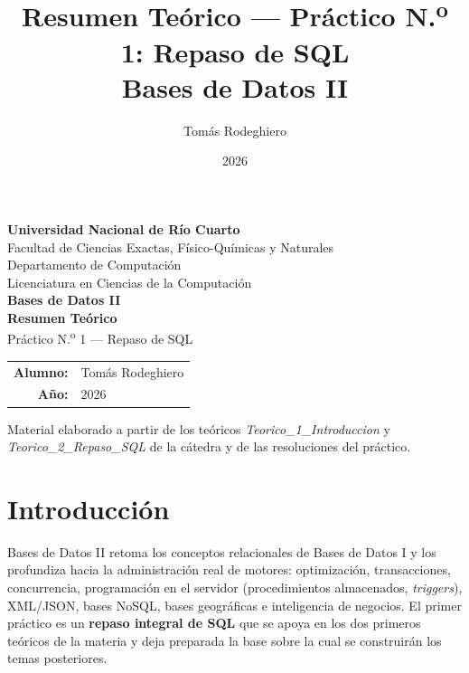 \documentclass[11pt,a4paper]{article}
\title{Resumen Teórico --- Práctico N.\textsuperscript{o} 1: Repaso de SQL\\[4pt]
       \large Bases de Datos II}
\author{Tomás Rodeghiero}
\date{2026}
\begin{document}
\begin{titlepage}
    \centering
    \vspace*{1.5cm}

    {\large \textbf{Universidad Nacional de Río Cuarto}}\\[6pt]
    {\normalsize Facultad de Ciencias Exactas, Físico-Químicas y Naturales}\\[4pt]
    {\normalsize Departamento de Computación}\\[4pt]
    {\normalsize Licenciatura en Ciencias de la Computación}\\[3cm]

    {\Large \textbf{Bases de Datos II}}\\[1.2cm]

    {\Large \textbf{Resumen Teórico}}\\[6pt]
    {\large Práctico N.\textsuperscript{o} 1 --- Repaso de SQL}\\[3cm]

    \begin{tabular}{rl}
        \textbf{Alumno:} & Tomás Rodeghiero \\[4pt]
        \textbf{Año:}    & 2026 \\
    \end{tabular}

    \vfill
    {\small Material elaborado a partir de los teóricos
    \emph{Teorico\_1\_Introduccion} y \emph{Teorico\_2\_Repaso\_SQL}
    de la cátedra y de las resoluciones del práctico.}
\end{titlepage}

\tableofcontents
\newpage

\section{Introducción}

Bases de Datos II retoma los conceptos relacionales de Bases de Datos I y los
profundiza hacia la administración real de motores: optimización, transacciones,
concurrencia, programación en el servidor (procedimientos almacenados,
\emph{triggers}), \mbox{XML/JSON}, bases NoSQL, bases geográficas e inteligencia
de negocios. El primer práctico es un \textbf{repaso integral de SQL} que se
apoya en los dos primeros teóricos de la materia y deja preparada la base
sobre la cual se construirán los temas posteriores.
\end{document}
